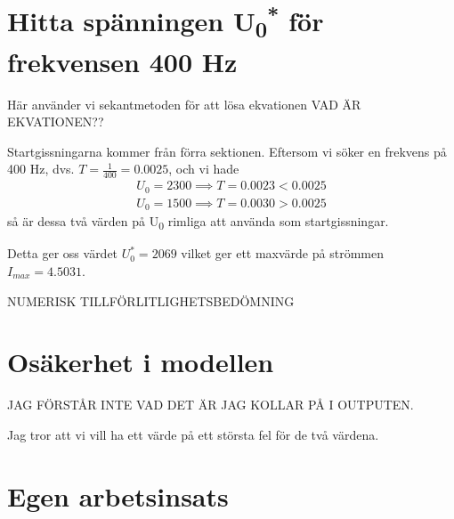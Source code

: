 \documentclass[a4paper, titlepage, 11pt]{article}
\begin{document}
\section{Hitta spänningen U\textsubscript{0}\textsuperscript{*} för frekvensen 400 Hz}
Här använder vi sekantmetoden för att lösa ekvationen VAD ÄR EKVATIONEN??

Startgissningarna kommer från förra sektionen. Eftersom vi söker en frekvens på 400 Hz, dvs. $T = \frac{1}{400} = 0.0025$, och vi hade
\begin{gather*}
    U_0 = 2300 \implies T = 0.0023 < 0.0025 \\
    U_0 = 1500 \implies T = 0.0030 > 0.0025
\end{gather*}
så är dessa två värden på U\textsubscript{0} rimliga att använda som startgissningar.

Detta ger oss värdet $U_0^* = 2069$ vilket ger ett maxvärde på strömmen $I_{max} = 4.5031$.

NUMERISK TILLFÖRLITLIGHETSBEDÖMNING


\section{Osäkerhet i modellen}
JAG FÖRSTÅR INTE VAD DET ÄR JAG KOLLAR PÅ I OUTPUTEN.

Jag tror att vi vill ha ett värde på ett största fel för de två värdena.



\section{Egen arbetsinsats}
\end{document}
